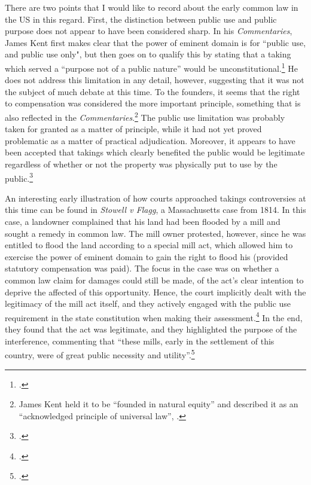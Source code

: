 There are two points that I would like to record about the early common law in the US  in this regard. First, the distinction between public use and public purpose does not appear to have been considered sharp. In his {\it Commentaries}, James Kent first makes clear that the power of eminent domain is for ``public use, and public use only", but then goes on to qualify this by stating that a taking which served a ``purpose not of a public nature'' would be unconstitutional.\footcite[See][275-276]{kent27}  He does not address this limitation in any detail, however, suggesting that it was not the subject of much debate at this time. To the founders, it seems that the right to compensation was considered the more important principle, something that is also reflected in the {\it Commentaries}.\footnote{James Kent held it to be  ``founded in natural equity'' and described it as an ``acknowledged principle of universal law'', \cite[see][276]{kent27}.} The public use limitation was probably taken for granted as a matter of principle, while it had not yet proved problematic as a matter of practical adjudication. Moreover, it appears to have been accepted that takings which clearly benefited the public would be legitimate regardless of whether or not the property was physically put to use by the public.\footcite{johnson11}

An interesting early illustration of how courts approached takings controversies at this time can be found in {\it Stowell v Flagg}, a Massachusetts case from 1814. In this case, a landowner complained that his land had been flooded by a mill and sought a remedy in common law. The mill owner protested, however, since he was entitled to flood the land according to a special mill act, which allowed him to exercise the power of eminent domain to gain the right to flood his  (provided statutory compensation was paid). The focus in the case was on whether a common law claim for damages could still be made,  of the act's clear intention to deprive the affected  of this opportunity. Hence, the court implicitly dealt with the legitimacy of the mill act itself, and they actively engaged with the public use requirement in the state constitution when making their assessment.\footcite{stowell14} In the end, they found that the act was legitimate, and they highlighted the purpose of the interference, commenting that ``these mills, early in the settlement of this country, were of great public necessity and utility''.\footcite[366]{stowell14} 

